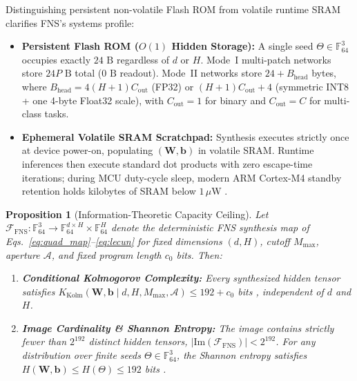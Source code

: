 Distinguishing persistent non-volatile Flash ROM from volatile runtime SRAM clarifies FNS's systems profile:
\begin{itemize}
    \item \textbf{Persistent Flash ROM ($O(1)$ Hidden Storage):} A single seed $\Theta \in \mathbb{F}_{64}^3$ occupies exactly $24\text{ B}$ regardless of $d$ or $H$. Mode~I multi-patch networks store $24P\text{ B}$ total ($0\text{ B}$ readout). Mode~II networks store $24 + B_{\mathrm{head}}$ bytes, where $B_{\mathrm{head}} = 4(H+1)C_{\mathrm{out}}$ (FP32) or $(H+1)C_{\mathrm{out}} + 4$ (symmetric INT8 + one 4-byte Float32 scale), with $C_{\mathrm{out}}=1$ for binary and $C_{\mathrm{out}}=C$ for multi-class tasks.
    \item \textbf{Ephemeral Volatile SRAM Scratchpad:} Synthesis executes strictly once at device power-on, populating $(\mathbf{W},\mathbf{b})$ in volatile SRAM. Runtime inferences then execute standard dot products with zero escape-time iterations; during MCU duty-cycle sleep, modern ARM Cortex-M4 standby retention holds kilobytes of SRAM below $1\,\mu\text{W}$ \cite{stmicro2021stm32l}.
\end{itemize}

\newtheorem{proposition}{Proposition}
\newtheorem{remark}{Remark}

\begin{proposition}[Information-Theoretic Capacity Ceiling]
\label{prop:capacity}
Let $\mathcal{F}_{\mathrm{FNS}} : \mathbb{F}_{64}^3 \to \mathbb{F}_{64}^{d\times H}\times\mathbb{F}_{64}^H$ denote the deterministic FNS synthesis map of Eqs.~\eqref{eq:quad_map}--\eqref{eq:lecun} for fixed dimensions $(d,H)$, cutoff $M_{\max}$, aperture $\mathcal{A}$, and fixed program length $c_0$ bits. Then:
\begin{enumerate}
    \item \textbf{Conditional Kolmogorov Complexity:} Every synthesized hidden tensor satisfies $K_{\mathrm{Kolm}}(\mathbf{W},\mathbf{b}\mid d, H, M_{\max}, \mathcal{A}) \le 192 + c_0$ bits \cite{li2019kolmogorov}, independent of $d$ and $H$.
    \item \textbf{Image Cardinality \& Shannon Entropy:} The image contains strictly fewer than $2^{192}$ distinct hidden tensors, $|\mathrm{Im}(\mathcal{F}_{\mathrm{FNS}})| < 2^{192}$. For any distribution over finite seeds $\Theta \in \mathbb{F}_{64}^3$, the Shannon entropy satisfies $H(\mathbf{W},\mathbf{b}) \le H(\Theta) \le 192$ bits \cite{shannon1948mathematical}.
\end{enumerate}
\end{proposition}

